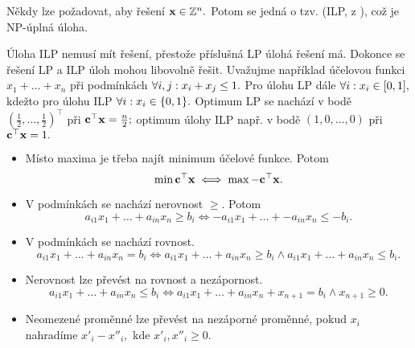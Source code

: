 \begin{remark}
    Někdy lze požadovat, aby řešení $\mathbf{x} \in \mathbb{Z}^n.$ Potom se jedná
    o tzv.  (ILP, z 
    ), což je NP-úplná úloha.

    Úloha ILP nemusí mít řešení, přestože příslušná LP úlohá řešení má.
    Dokonce se řešení LP a ILP úloh mohou libovolně řešit. Uvažujme
    například účelovou funkci $x_1 + \dots + x_n$ při podmínkách
    $\forall i,j: x_i + x_j \leq 1.$ Pro úlohu LP dále $\forall i: x_i \in [0,1],$
    kdežto pro úlohu ILP $\forall i: x_i \in \{0,1\}.$ Optimum LP se nachází
    v bodě $(\frac{1}{2}, \dots, \frac{1}{2})^\top$ při $\mathbf{c}^\top\mathbf{x} = 
    \frac{n}{2};$ optimum úlohy ILP např. v bodě $(1,0,\dots,0)$ 
    při $\mathbf{c}^\top\mathbf{x} = 1.$
\end{remark}

\begin{remark}
    \leavevmode
    \begin{itemize}
        \item Místo maxima je třeba najít minimum účelové funkce. Potom
            \[ \min \mathbf{c}^\top\mathbf{x} \iff \max -\mathbf{c}^\top\mathbf{x}. \]
        \item V podmínkách se nachází nerovnost $\geq.$ Potom
            \[ a_{i1}x_1 + \dots + a_{in}x_n \geq b_i \iff 
            -a_{i1}x_1 + \dots + -a_{in}x_n \leq -b_i. \]
        \item V podmínkách se nachází rovnost.
            \[ 
                a_{i1}x_1 + \dots + a_{in}x_n = b_i \iff 
                a_{i1}x_1 + \dots + a_{in}x_n \geq b_i \land
                a_{i1}x_1 + \dots + a_{in}x_n \leq b_i.
            \]
        \item Nerovnost lze převést na rovnost a nezápornost.
            \[
                a_{i1}x_1 + \dots + a_{in}x_n \leq b_i \iff
                a_{i1}x_1 + \dots + a_{in}x_n + x_{n+1} = b_i 
                \land x_{n+1} \geq 0.
            \]
        \item Neomezené proměnné lze převést na nezáporné proměnné, pokud
            $x_i$ nahradíme $x'_i - x''_i,$ kde $x'_i,x''_i \geq 0.$
    \end{itemize}
\end{remark}

